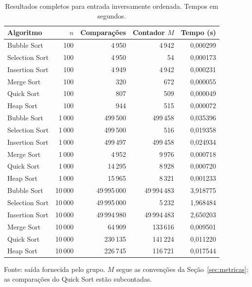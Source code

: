 \begin{table}[htbp]
\centering
\small
\caption{Resultados completos para entrada inversamente ordenada. Tempos em segundos.}
\label{tab:reverse_sorted}
\begin{tabular}{lrrrr}
\toprule
Algoritmo & $n$ & Comparações & Contador $M$ & Tempo (s) \\
\midrule
Bubble Sort & 100 & 4\,950 & 4\,942 & 0,000299 \\
Selection Sort & 100 & 4\,950 & 54 & 0,000173 \\
Insertion Sort & 100 & 4\,949 & 4\,942 & 0,000231 \\
Merge Sort & 100 & 320 & 672 & 0,000055 \\
Quick Sort & 100 & 807 & 509 & 0,000049 \\
Heap Sort & 100 & 944 & 515 & 0,000072 \\
\midrule
Bubble Sort & 1\,000 & 499\,500 & 499\,458 & 0,035396 \\
Selection Sort & 1\,000 & 499\,500 & 516 & 0,019358 \\
Insertion Sort & 1\,000 & 499\,497 & 499\,458 & 0,024934 \\
Merge Sort & 1\,000 & 4\,952 & 9\,976 & 0,000718 \\
Quick Sort & 1\,000 & 14\,295 & 8\,928 & 0,000720 \\
Heap Sort & 1\,000 & 15\,965 & 8\,321 & 0,001233 \\
\midrule
Bubble Sort & 10\,000 & 49\,995\,000 & 49\,994\,483 & 3,918775 \\
Selection Sort & 10\,000 & 49\,995\,000 & 5\,232 & 1,968484 \\
Insertion Sort & 10\,000 & 49\,994\,980 & 49\,994\,483 & 2,650203 \\
Merge Sort & 10\,000 & 64\,909 & 133\,616 & 0,009501 \\
Quick Sort & 10\,000 & 230\,135 & 141\,224 & 0,011220 \\
Heap Sort & 10\,000 & 226\,745 & 116\,721 & 0,017544 \\
\bottomrule
\end{tabular}
\par\smallskip\footnotesize Fonte: saída fornecida pelo grupo. $M$ segue as convenções da Seção~\ref{sec:metricas}; as comparações do Quick Sort estão subcontadas.
\end{table}
